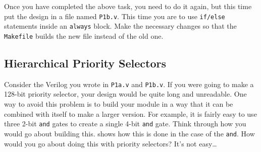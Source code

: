 \documentclass{article}
\begin{document}
Once you have completed the above task, you need to do it again, but this time
put the design in a file named \texttt{P1b.v}. This time you are to use
\texttt{if/else} statements inside an \texttt{always} block. Make the necessary
changes so that the \texttt{Makefile} builds the new file instead of the old
one. 

\subsection{Hierarchical Priority Selectors}

Consider the Verilog you wrote in \texttt{P1a.v} and \texttt{P1b.v}. If you were
going to make a 128-bit priority selector, your design would be quite long and
unreadable. One way to avoid this problem is to build your module in a way that
it can be combined with itself to make a larger version. For example, it is
fairly easy to use three 2-bit \texttt{and} gates to create a single 4-bit
\texttt{and} gate. Think through how you would go about building this.
 shows how this is done in the case of the \texttt{and}. How would
you go about doing this with priority selectors? It's not easy\dots
\end{document}
